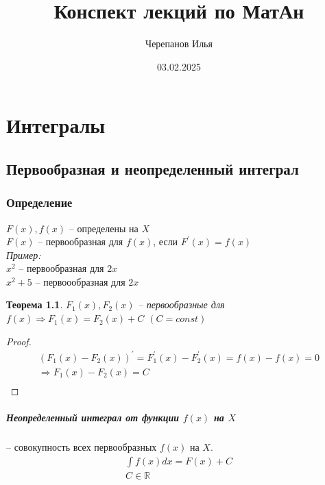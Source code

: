 \documentclass[12pt, fleqn]{book}
\title{Конспект лекций по МатАн}
\date{03.02.2025}
\author{Черепанов Илья}
\begin{document}
	\maketitle
	\tableofcontents{}
	\chapter{Интегралы}
	\section{Первообразная и неопределенный интеграл}
	\subsection{Определение}
	$F(x), f(x)$ -- определены на $X$\\
	$F(x)$ -- первообразная для $f(x)$, если $F^\prime(x)=f(x)$\\
	\textit{Пример:}\\
	$x^2$ -- первообразная для $2x$\\
	$x^2+5$ -- первоообразная для $2x$
	\theoremstyle{plain}
	\newtheorem*{Primitive Integral}{Теорема}
	\begin{Primitive Integral}
		$F_1(x), F_2(x)$ -- первообразные для $f(x) \Rightarrow F_1(x)=F_2(x)+C$ $(C=const)$
	\end{Primitive Integral}
	\begin{proof}
		\begin{multline*}
		\left(F_1(x) - F_2(x)\right)^\prime = F_1^\prime(x) - F_2^\prime(x)=f(x)-f(x)=0\\
		\Rightarrow F_1(x)-F_2(x) = C\\
		\end{multline*}
	\end{proof}
	\paragraph{Неопределенный интеграл от функции $f(x)$ на $X$} -- совокупность всех первообразных $f(x)$ на $X$.
	\begin{multline*}
		\int f(x)dx=F(x)+C\\
		C\in \mathbb{R}\\
	\end{multline*}
\end{document}
